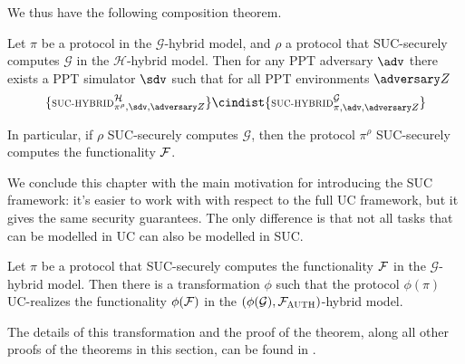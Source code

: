 We thus have the following composition theorem.
\begin{theorem}
    Let $\pi$ be a protocol in the $\mathcal G$-hybrid model, and $\rho$ a protocol that SUC-securely computes $\mathcal G$ in the $\mathcal H$-hybrid model. Then for any PPT adversary $\adv$ there exists a PPT simulator $\sdv$ such that for all PPT environments $\zdv$
    $$ \{ \textsc{\scriptsize SUC-HYBRID}^{\mathcal H}_{\pi^{\rho}, \sdv, \zdv} \} \cindist \{ \textsc{\scriptsize SUC-HYBRID}^{\mathcal G}_{\pi, \adv, \zdv} \}$$
    
    In particular, if $\rho$ SUC-securely computes $\mathcal G$, then the protocol $\pi^\rho$ SUC-securely computes the functionality $\mathcal{F}$.
\end{theorem}

We conclude this chapter with the main motivation for introducing the SUC framework: it's easier to work with with respect to the full UC framework, but it gives the same security guarantees. The only difference is that not all tasks that can be modelled in UC can also be modelled in SUC.

\begin{theorem}
    Let $\pi$ be a protocol that SUC-securely computes the functionality $\mathcal{F}$ in the $\mathcal G$-hybrid model. Then there is a transformation $\phi$ such that the protocol $\phi(\pi)$ UC-realizes the functionality $\phi(\mathcal{F})$ in the $(\phi(\mathcal G), \mathcal{F}_{\textsc{AUTH}})$-hybrid model.
\end{theorem}

The details of this transformation and the proof of the theorem, along all other proofs of the theorems in this section, can be found in \cite{Canetti_SUC}.